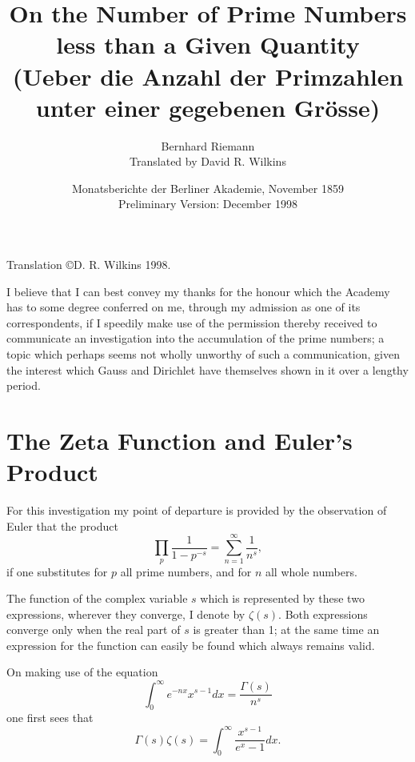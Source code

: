 \documentclass[12pt]{article}
\title{On the Number of Prime Numbers less than a Given Quantity\\
{\normalsize (Ueber die Anzahl der Primzahlen unter einer gegebenen Gr\"osse)}}
\author{Bernhard Riemann\\
{\small Translated by David R. Wilkins}}
\date{Monatsberichte der Berliner Akademie, November 1859\\
{\small Preliminary Version: December 1998}}
\begin{document}
\maketitle

\noindent Translation \copyright D. R. Wilkins 1998.

I believe that I can best convey my thanks for the honour which the Academy has to some degree conferred on me, through my admission as one of its correspondents, if I speedily make use of the permission thereby received to communicate an investigation into the accumulation of the prime numbers; a topic which perhaps seems not wholly unworthy of such a communication, given the interest which Gauss and Dirichlet have themselves shown in it over a lengthy period.

\section{The Zeta Function and Euler's Product}

For this investigation my point of departure is provided by the observation of Euler that the product
\begin{equation}
\prod_p \frac{1}{1-p^{-s}} = \sum_{n=1}^{\infty} \frac{1}{n^s},
\label{eq:euler_product}
\end{equation}
if one substitutes for $p$ all prime numbers, and for $n$ all whole numbers.

The function of the complex variable $s$ which is represented by these two expressions, wherever they converge, I denote by $\zeta(s)$. Both expressions converge only when the real part of $s$ is greater than 1; at the same time an expression for the function can easily be found which always remains valid.

On making use of the equation
\begin{equation}
\int_0^{\infty} e^{-nx} x^{s-1} dx = \frac{\Gamma(s)}{n^s}
\label{eq:gamma_integral}
\end{equation}
one first sees that
\begin{equation}
\Gamma(s)\zeta(s) = \int_0^{\infty} \frac{x^{s-1}}{e^x - 1} dx.
\label{eq:zeta_integral}
\end{equation}
\end{document}
